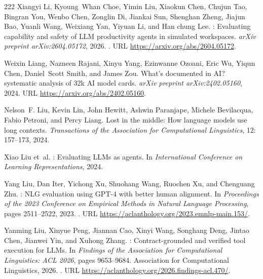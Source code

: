 \begin{thebibliography}{222}
Xiangyi Li, Kyoung~Whan Choe, Yimin Liu, Xiaokun Chen, Chujun Tao, Bingran You,
  Wenbo Chen, Zonglin Di, Jiankai Sun, Shenghan Zheng, Jiajun Bao, Yuanli Wang,
  Weixiang Yan, Yiyuan Li, and Han chung Lee.
: Evaluating capability and safety of {LLM} productivity
  agents in simulated workspaces.
\newblock \emph{arXiv preprint arXiv:2604.05172}, 2026{}.
\newblock {}.
\newblock URL \url{https://arxiv.org/abs/2604.05172}.

Weixin Liang, Nazneen Rajani, Xinyu Yang, Ezinwanne Ozoani, Eric Wu, Yiqun
  Chen, Daniel~Scott Smith, and James Zou.
\newblock What's documented in {AI}? systematic analysis of 32k {AI} model
  cards.
\newblock \emph{arXiv preprint arXiv:2402.05160}, 2024.
\newblock URL \url{https://arxiv.org/abs/2402.05160}.

Nelson~F. Liu, Kevin Lin, John Hewitt, Ashwin Paranjape, Michele Bevilacqua,
  Fabio Petroni, and Percy Liang.
\newblock Lost in the middle: How language models use long contexts.
\newblock \emph{Transactions of the Association for Computational Linguistics},
  12: 157--173, 2024{}.

Xiao Liu et~al.
: Evaluating {LLM}s as agents.
\newblock In \emph{International Conference on Learning Representations},
  2024{}.

Yang Liu, Dan Iter, Yichong Xu, Shuohang Wang, Ruochen Xu, and Chenguang Zhu.
: {NLG} evaluation using {GPT-4} with better human alignment.
\newblock In \emph{Proceedings of the 2023 Conference on Empirical Methods in
  Natural Language Processing}, pages 2511--2522, 2023.
\newblock {}.
\newblock URL \url{https://aclanthology.org/2023.emnlp-main.153/}.

Yanming Liu, Xinyue Peng, Jiannan Cao, Xinyi Wang, Songhang Deng, Jintao Chen,
  Jianwei Yin, and Xuhong Zhang.
: Contract-grounded and verified tool execution for {LLM}s.
\newblock In \emph{Findings of the Association for Computational Linguistics:
  ACL 2026}, pages 9653--9684. Association for Computational Linguistics, 2026.
\newblock {}.
\newblock URL \url{https://aclanthology.org/2026.findings-acl.470/}.


\end{thebibliography}
